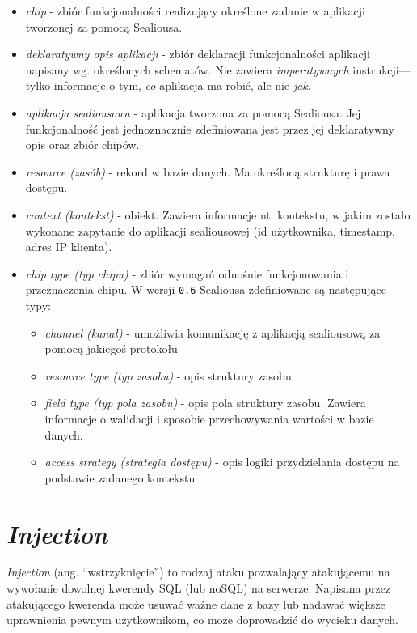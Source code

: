 \documentclass[12pt,polish,a4paper,]{report}
\providecommand{\tightlist}{%
  \setlength{\itemsep}{0pt}\setlength{\parskip}{0pt}}
\begin{document}
\begin{itemize}
\tightlist
\item
  \emph{chip} - zbiór funkcjonalności realizujący określone zadanie w
  aplikacji tworzonej za pomocą Sealiousa.
\item
  \emph{deklaratywny opis aplikacji} - zbiór deklaracji funkcjonalności
  aplikacji napisany wg. określonych schematów. Nie zawiera
  \emph{imperatywnych} instrukcji---tylko informacje o tym, \emph{co}
  aplikacja ma robić, ale nie \emph{jak}.
\item
  \emph{aplikacja sealiousowa} - aplikacja tworzona za pomocą Sealiousa.
  Jej funkcjonalność jest jednoznacznie zdefiniowana jest przez jej
  deklaratywny opis oraz zbiór chipów.
\item
  \emph{resource (zasób)} - rekord w bazie danych. Ma określoną
  strukturę i prawa dostępu.
\item
  \emph{context (kontekst)} - obiekt. Zawiera informacje nt. kontekstu,
  w jakim zostało wykonane zapytanie do aplikacji sealiousowej (id
  użytkownika, timestamp, adres IP klienta).
\item
  \emph{chip type (typ chipu)} - zbiór wymagań odnośnie funkcjonowania i
  przeznaczenia chipu. W wersji \texttt{0.6} Sealiousa zdefiniowane są
  następujące typy:

  \begin{itemize}
  \tightlist
  \item
    \emph{channel (kanał)} - umożliwia komunikację z aplikacją
    sealiousową za pomocą jakiegoś protokołu
  \item
    \emph{resource type (typ zasobu)} - opis struktury zasobu
  \item
    \emph{field type (typ pola zasobu)} - opis pola struktury zasobu.
    Zawiera informacje o walidacji i sposobie przechowywania wartości w
    bazie danych.
  \item
    \emph{access strategy (strategia dostępu)} - opis logiki
    przydzielania dostępu na podstawie zadanego kontekstu
  \end{itemize}
\end{itemize}

\chapter{\texorpdfstring{\emph{Injection}}{Injection}}\label{injection}

\emph{Injection} (ang. ``wstrzyknięcie'') to rodzaj ataku pozwalający
atakującemu na wywołanie dowolnej kwerendy SQL (lub noSQL) na serwerze.
Napisana przez atakującego kwerenda może usuwać ważne dane z bazy lub
nadawać większe uprawnienia pewnym użytkownikom, co może doprowadzić do
wycieku danych.
\end{document}
